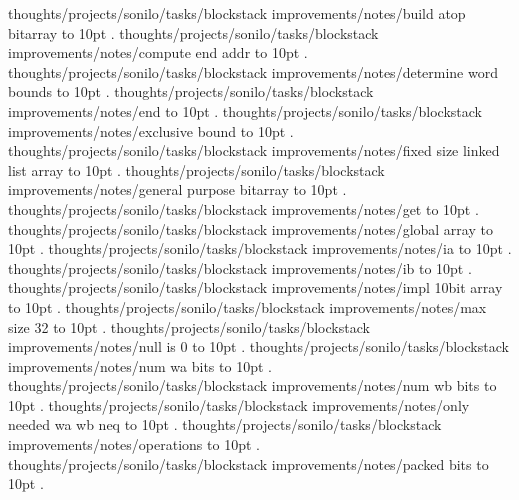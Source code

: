 \smallskip
thoughts/projects/sonilo/tasks/blockstack improvements/notes/build atop bitarray \leaders\hbox to 10pt {\hss.\hss}  \hfill {}
\smallskip
thoughts/projects/sonilo/tasks/blockstack improvements/notes/compute end addr \leaders\hbox to 10pt {\hss.\hss}  \hfill {}
\smallskip
thoughts/projects/sonilo/tasks/blockstack improvements/notes/determine word bounds \leaders\hbox to 10pt {\hss.\hss}  \hfill {}
\smallskip
thoughts/projects/sonilo/tasks/blockstack improvements/notes/end \leaders\hbox to 10pt {\hss.\hss}  \hfill {}
\smallskip
thoughts/projects/sonilo/tasks/blockstack improvements/notes/exclusive bound \leaders\hbox to 10pt {\hss.\hss}  \hfill {}
\smallskip
thoughts/projects/sonilo/tasks/blockstack improvements/notes/fixed size linked list array \leaders\hbox to 10pt {\hss.\hss}  \hfill {}
\smallskip
thoughts/projects/sonilo/tasks/blockstack improvements/notes/general purpose bitarray \leaders\hbox to 10pt {\hss.\hss}  \hfill {}
\smallskip
thoughts/projects/sonilo/tasks/blockstack improvements/notes/get \leaders\hbox to 10pt {\hss.\hss}  \hfill {}
\smallskip
thoughts/projects/sonilo/tasks/blockstack improvements/notes/global array \leaders\hbox to 10pt {\hss.\hss}  \hfill {}
\smallskip
thoughts/projects/sonilo/tasks/blockstack improvements/notes/ia \leaders\hbox to 10pt {\hss.\hss}  \hfill {}
\smallskip
thoughts/projects/sonilo/tasks/blockstack improvements/notes/ib \leaders\hbox to 10pt {\hss.\hss}  \hfill {}
\smallskip
thoughts/projects/sonilo/tasks/blockstack improvements/notes/impl 10bit array \leaders\hbox to 10pt {\hss.\hss}  \hfill {}
\smallskip
thoughts/projects/sonilo/tasks/blockstack improvements/notes/max size 32 \leaders\hbox to 10pt {\hss.\hss}  \hfill {}
\smallskip
thoughts/projects/sonilo/tasks/blockstack improvements/notes/null is 0 \leaders\hbox to 10pt {\hss.\hss}  \hfill {}
\smallskip
thoughts/projects/sonilo/tasks/blockstack improvements/notes/num wa bits \leaders\hbox to 10pt {\hss.\hss}  \hfill {}
\smallskip
thoughts/projects/sonilo/tasks/blockstack improvements/notes/num wb bits \leaders\hbox to 10pt {\hss.\hss}  \hfill {}
\smallskip
thoughts/projects/sonilo/tasks/blockstack improvements/notes/only needed wa wb neq \leaders\hbox to 10pt {\hss.\hss}  \hfill {}
\smallskip
thoughts/projects/sonilo/tasks/blockstack improvements/notes/operations \leaders\hbox to 10pt {\hss.\hss}  \hfill {}
\smallskip
thoughts/projects/sonilo/tasks/blockstack improvements/notes/packed bits \leaders\hbox to 10pt {\hss.\hss}  \hfill {}
